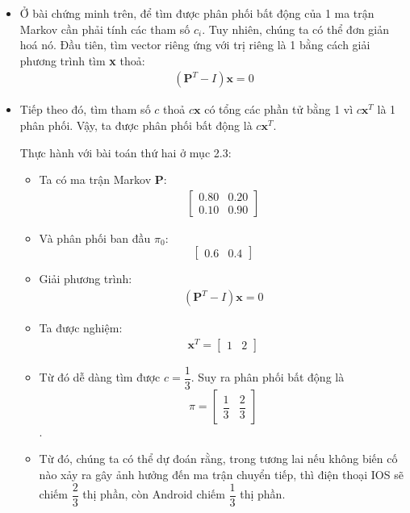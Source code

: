 \begin{itemize}
    \item Ở bài chứng minh trên, để tìm được phân phối bất động của 1 ma trận Markov cần phải tính các tham số $c_i$. Tuy nhiên, chúng ta có thể đơn giản hoá nó. Đầu tiên, tìm vector riêng ứng với trị riêng là 1 bằng cách giải phương trình tìm \textbf{x} thoả:
    \begin{align}
        (\mathbf{P}^T - I)\textbf{x} = 0
    \end{align}

    \item Tiếp theo đó, tìm tham số $c$ thoả $c \textbf{x}$ có tổng các phần tử bằng 1 vì $c\textbf{x}^T$ là 1 phân phối. Vậy, ta được phân phối bất động là $c \textbf{x}^T$.
    
    \begin{egvn}
        Thực hành với bài toán thứ hai ở mục 2.3: 
        \begin{itemize}
        \item Ta có ma trận Markov $\mathbf{P}$:
        \begin{align}
            \begin{bmatrix}
                0.80 & 0.20 \\
                0.10 & 0.90 
            \end{bmatrix}
        \end{align}
    
        \item Và phân phối ban đầu $\pi_0$:
                $$\begin{bmatrix}
                        0.6 & 0.4  
                \end{bmatrix}$$
    
        \item Giải phương trình: 
        \begin{align}
            (\mathbf{P}^T - I)\textbf{x} = 0
        \end{align}
    
        \item Ta được nghiệm:
        \begin{align}
            \textbf{x}^T = \begin{bmatrix}
                1 & 2
            \end{bmatrix}
        \end{align}
    
        \item Từ đó dễ dàng tìm được $c = \dfrac{1}{3}$. Suy ra phân phối bất động là $$
        \pi =
        \begin{bmatrix}
            \dfrac{1}{3} & \dfrac{2}{3}
        \end{bmatrix} $$.
    
        \item Từ đó, chúng ta có thể dự đoán rằng, trong tương lai nếu không biến cố nào xảy ra gây ảnh hưởng đến ma trận chuyển tiếp, thì điện thoại IOS sẽ chiếm $\dfrac{2}{3}$ thị phần, còn Android chiếm $\dfrac{1}{3}$ thị phần. 
        
        \end{itemize}
    \end{egvn}
\end{itemize}